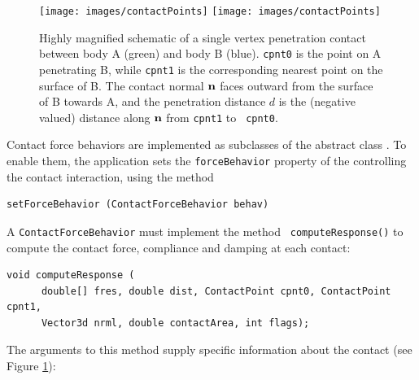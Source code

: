 \begin{figure}[ht]
\begin{center}
\iflatexml
 \texttt{[image: images/contactPoints]}
\else
 \texttt{[image: images/contactPoints]}
\fi
\end{center}
\caption{Highly magnified schematic of a single vertex penetration contact
between body A (green) and body B (blue). {\tt cpnt0} is the point on
A penetrating B, while {\tt cpnt1} is the corresponding nearest point
on the surface of B. The contact normal ${\bf n}$ faces outward from the
surface of B towards A, and the penetration distance $d$ is the
(negative valued) distance along ${\bf n}$ from {\tt cpnt1} to {\tt
cpnt0}.}
\label{contactPoints:fig}
\end{figure}

Contact force behaviors are implemented as subclasses of the abstract
class
.
To enable them, the application sets the {\tt forceBehavior} property
of the 
controlling the contact interaction, using the method
%
\begin{lstlisting}[]
  setForceBehavior (ContactForceBehavior behav)
\end{lstlisting}
%
A {\tt ContactForceBehavior} must implement the method {\tt
computeResponse()} to compute the contact force, compliance and
damping at each contact:
%
\begin{lstlisting}[]
  void computeResponse (
      double[] fres, double dist, ContactPoint cpnt0, ContactPoint cpnt1,
      Vector3d nrml, double contactArea, int flags);
\end{lstlisting}
%
The arguments to this method supply specific information about the
contact (see Figure \ref{contactPoints:fig}):

